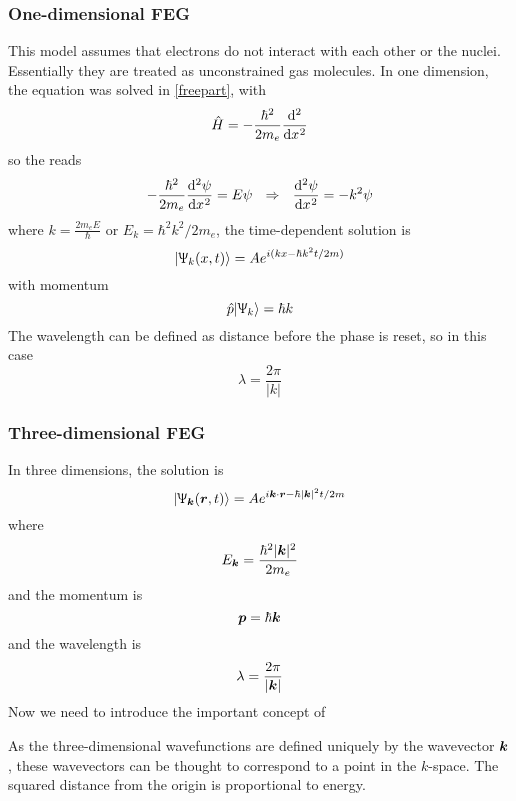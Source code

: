\subsubsection{One-dimensional FEG}
This model assumes that electrons do not interact with each other or the nuclei. Essentially they are treated as unconstrained gas molecules. In one dimension, the \sch equation was solved in \cref{freepart}, with 
\begin{equation}
	\hat{H}=-\frac{\hbar^2}{2m_e}\diff[2]{}{x}
\end{equation}
so the \sch reads
\begin{equation}
	-\frac{\hbar^2}{2m_e}\diff[2]{\psi}{x}=E\psi\ \ \imp\ \ \diff[2]{\psi}{x}=-k^2\psi
\end{equation}
where $k=\frac{2m_eE}{\hbar}$ or $E_k=\hbar^2k^2/2m_e$, the time-dependent solution is 
\begin{equation}
	|\Uppsi_k(x,t)\rangle=Ae^{i(kx-\hbar k^2t/2m)}
\end{equation}
with momentum
\begin{equation}
	\hat{p}|\Uppsi_k\rangle=\hbar k
\end{equation}
The wavelength can be defined as distance before the phase is reset, so in this case
\begin{equation}
	\lambda=\frac{2\pi}{|k|}
\end{equation}
\subsubsection{Three-dimensional FEG}
In three dimensions, the solution is 
\begin{equation}
	|\Uppsi_{\boldsymbol{k}}(\boldsymbol{r},t)\rangle=Ae^{i\boldsymbol{k}\cdot\boldsymbol{r}-\hbar |\boldsymbol{k}|^2t/2m}
\end{equation}
where
\begin{equation}
	E_{\boldsymbol{k}}=\frac{\hbar^2|\boldsymbol{k}|^2}{2m_e}
\end{equation}
and the momentum is
\begin{equation}
	\boldsymbol{p}=\hbar\boldsymbol{k}
\end{equation}
and the wavelength is
\begin{equation}
	\lambda=\frac{2\pi}{|\boldsymbol{k}|}
\end{equation}
Now we need to introduce the important concept of 
\begin{defi}[$k$-space]
As the three-dimensional wavefunctions are defined uniquely by the wavevector $\boldsymbol{k}$, these wavevectors can be thought to correspond to a point in the $k$-space. The squared distance from the origin is proportional to energy.
\end{defi}
